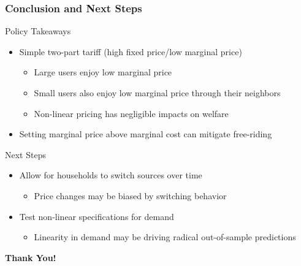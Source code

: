 \documentclass[aspectratio=149]{beamer}
\begin{document}
\begin{frame}
\frametitle{Conclusion and Next Steps}

Policy Takeaways
\begin{itemize}
  \item Simple two-part tariff (high fixed price/low marginal price)
    \begin{itemize}
      \item Large users enjoy low marginal price
      \item Small users also enjoy low marginal price through their neighbors
      \item Non-linear pricing has negligible impacts on welfare
    \end{itemize}
  \item Setting marginal price above marginal cost can mitigate free-riding
\end{itemize}
\vspace{.2cm}
Next Steps
\begin{itemize}
  \item Allow for households to switch sources over time
    \begin{itemize}
      \item Price changes may be biased by switching behavior
    \end{itemize}
  \item Test non-linear specifications for demand
    \begin{itemize}
      \item Linearity in demand may be driving radical out-of-sample predictions
    \end{itemize}
\end{itemize}
\end{frame}



\begin{frame}
\begin{center}
\textcolor{navyblue}{\Large \bf Thank You! } 
\end{center}
\end{frame}







\end{document}
